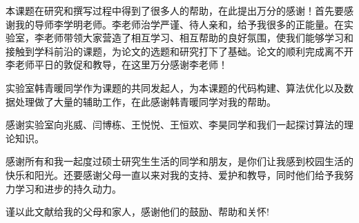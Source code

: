 
\begin{acknowledgement}
本课题在研究和撰写过程中得到了很多人的帮助，在此提出万分的感谢！首先要感谢我的导师李学明老师。李老师治学严谨、待人亲和，给予我很多的正能量。在实验室，李老师带领大家营造了相互学习、相互帮助的良好氛围，使我们能够学习和接触到学科前沿的课题，为论文的选题和研究打下了基础。论文的顺利完成离不开李老师平日的敦促和教导，在这里万分感谢李老师！

实验室韩青暖同学作为课题的共同发起人，为本课题的代码构建、算法优化以及数据处理做了大量的辅助工作，在此感谢韩青暖同学对我的帮助。

感谢实验室向兆威、闫博栋、王悦悦、王恒欢、李昊同学和我们一起探讨算法的理论知识。

感谢所有和我一起度过硕士研究生生活的同学和朋友，是你们让我感到校园生活的快乐和阳光。还要感谢父母一直以来对我的支持、爱护和教导，同时他们给予我努力学习和进步的持久动力。

谨以此文献给我的父母和家人，感谢他们的鼓励、帮助和关怀!
\end{acknowledgement}
